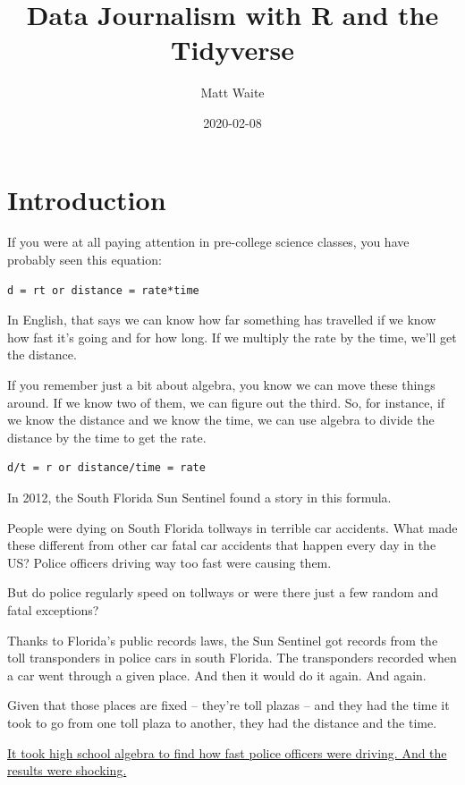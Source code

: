 \documentclass[]{book}
\title{Data Journalism with R and the Tidyverse}
\author{Matt Waite}
\date{2020-02-08}
\begin{document}
\maketitle

{
\setcounter{tocdepth}{1}
\tableofcontents
}
\hypertarget{introduction}{%
\chapter{Introduction}\label{introduction}}

If you were at all paying attention in pre-college science classes, you have probably seen this equation:

\begin{verbatim}
d = rt or distance = rate*time
\end{verbatim}

In English, that says we can know how far something has travelled if we know how fast it's going and for how long. If we multiply the rate by the time, we'll get the distance.

If you remember just a bit about algebra, you know we can move these things around. If we know two of them, we can figure out the third. So, for instance, if we know the distance and we know the time, we can use algebra to divide the distance by the time to get the rate.

\begin{verbatim}
d/t = r or distance/time = rate
\end{verbatim}

In 2012, the South Florida Sun Sentinel found a story in this formula.

People were dying on South Florida tollways in terrible car accidents. What made these different from other car fatal car accidents that happen every day in the US? Police officers driving way too fast were causing them.

But do police regularly speed on tollways or were there just a few random and fatal exceptions?

Thanks to Florida's public records laws, the Sun Sentinel got records from the toll transponders in police cars in south Florida. The transponders recorded when a car went through a given place. And then it would do it again. And again.

Given that those places are fixed -- they're toll plazas -- and they had the time it took to go from one toll plaza to another, they had the distance and the time.

\href{http://www.sun-sentinel.com/news/local/speeding-cops/fl-speeding-cops-20120211,0,3706919.story}{It took high school algebra to find how fast police officers were driving. And the results were shocking.}
\end{document}
